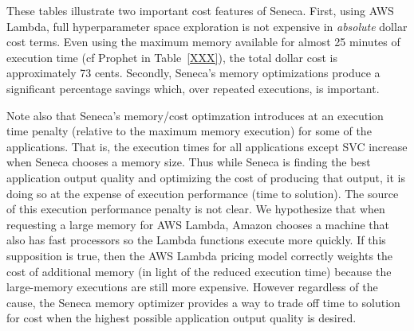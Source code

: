 These tables illustrate two important cost features of Seneca.  First, using
AWS Lambda, full hyperparameter space exploration is not expensive in 
\textit{absolute} dollar cost terms.  Even using the maximum memory available
for almost 25 minutes of execution time (cf Prophet in Table~\ref{XXX}), the
total dollar cost is approximately 73 cents.  Secondly, Seneca's memory
optimizations produce a significant percentage savings which, over repeated
executions, is important.  

Note also that Seneca's memory/cost optimzation
introduces at an execution time penalty (relative to the maximum memory
execution) for some of the applications.  That is, the
execution times for all applications except SVC increase when Seneca chooses
a memory size.  Thus while Seneca is finding the best application output
quality and optimizing the cost of producing that output, it is doing so at
the expense of execution performance (time to solution).    
The source of this execution performance penalty is not clear.  We hypothesize
that when requesting a large memory for AWS Lambda, Amazon chooses a machine
that also has fast processors so the Lambda functions execute more quickly.
If this supposition is true, then the AWS Lambda pricing model correctly
weights the cost of additional memory (in light of the reduced execution time)
because the large-memory executions are still more expensive.
However regardless of the cause, the Seneca memory optimizer 
provides a way to trade off time to solution for cost when the highest
possible application output quality is desired.








